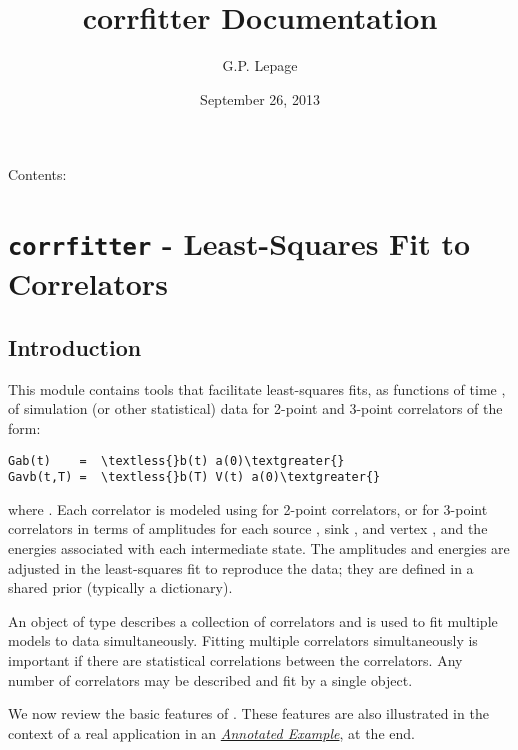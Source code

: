 \documentclass[letterpaper,10pt,english]{sphinxmanual}
\title{corrfitter Documentation}
\date{September 26, 2013}
\author{G.P. Lepage}
\begin{document}
\maketitle
\tableofcontents
{}\label{index::doc}


Contents:


\chapter{\texttt{corrfitter} - Least-Squares Fit to Correlators}
\label{corrfitter:corrfitter-documentation}\label{corrfitter::doc}\label{corrfitter:corrfitter-least-squares-fit-to-correlators}

\section{Introduction}
\label{corrfitter:introduction}
This module contains tools that facilitate least-squares fits, as functions
of time , of simulation (or other statistical) data for 2-point and
3-point correlators of the form:

\begin{Verbatim}[commandchars=\\\{\}]
Gab(t)    =  \textless{}b(t) a(0)\textgreater{}
Gavb(t,T) =  \textless{}b(T) V(t) a(0)\textgreater{}
\end{Verbatim}

where . Each correlator is modeled using {\hyperref[corrfitter:corrfitter.Corr2]{}} for 2-point
correlators, or {\hyperref[corrfitter:corrfitter.Corr3]{}} for 3-point correlators in terms of amplitudes for
each source , sink , and vertex , and the energies
associated with each intermediate state. The amplitudes and energies are
adjusted in the least-squares fit to reproduce the data; they are defined
in a shared prior (typically a dictionary).

An object of type {\hyperref[corrfitter:corrfitter.CorrFitter]{}} describes a collection of correlators and is
used to fit multiple models to data simultaneously. Fitting multiple
correlators simultaneously is important if there are statistical
correlations between the correlators. Any number of correlators may be
described and fit by a single {\hyperref[corrfitter:corrfitter.CorrFitter]{}} object.

We now review the basic features of . These features are also
illustrated in the context of a real application in an
{\hyperref[corrfitter:annotated-example]{\emph{Annotated Example}}}, at the end.
\end{document}
